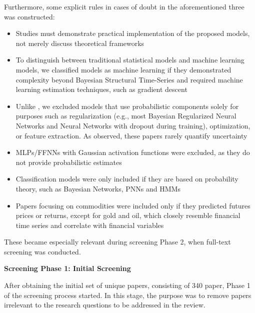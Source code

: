 Furthermore, some explicit rules in cases of doubt in the aforementioned three was constructed:
\begin{itemize}
    \item Studies must demonstrate practical implementation of the proposed models, not merely discuss theoretical frameworks
    \item To distinguish between traditional statistical models and machine learning models, we classified models as machine learning if they demonstrated complexity beyond Bayesian Structural Time-Series and required machine learning estimation techniques, such as gradient descent
    \item Unlike \textcite{Blasco_et_al_2024}, we excluded models that use probabilistic components solely for purposes such as regularization (e.g., most Bayesian Regularized Neural Networks and Neural Networks with dropout during training), optimization, or feature extraction. As \textcite{Blasco_et_al_2024} observed, these papers rarely quantify uncertainty
    \item MLPs/FFNNs with Gaussian activation functions were excluded, as they do not provide probabilistic estimates
    \item Classification models were only included if they are based on probability theory, such as Bayesian Networks, PNNs and HMMs
    \item Papers focusing on commodities were included only if they predicted futures prices or returns, except for gold and oil, which closely resemble financial time series and correlate with financial variables \parencite{Gokmenoglu2015}
\end{itemize}
These became especially relevant during screening Phase 2, when full-text screening was conducted. 

\textbf{Screening Phase 1: Initial Screening}\nopagebreak

After obtaining the initial set of unique papers, consisting of 340 paper, Phase 1 of the screening process started. In this stage, the purpose was to remove papers irrelevant to the research questions to be addressed in the review.

